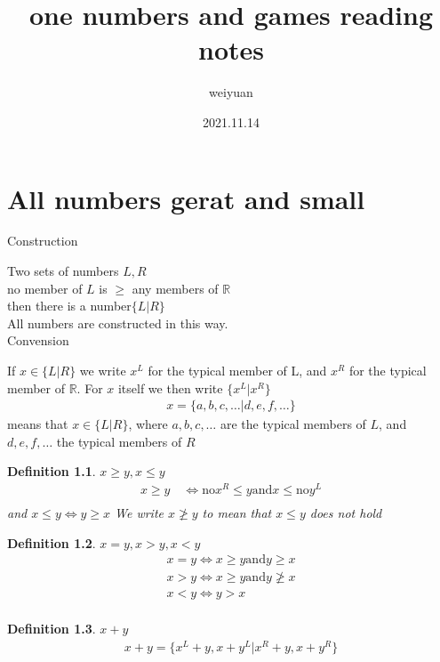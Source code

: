 \documentclass[10pt,a4paper]{book}
\title{one numbers and games reading notes}
\author{weiyuan}
\date{2021.11.14}
\newtheorem{myDef}{Definition}
\begin{document}
	\maketitle
\chapter{All numbers gerat and small}
Construction

Two sets of numbers $  L,R  $\\
no member of $ L $ is $ \ge  $ any members of $ \mathbb{R} $\\
then there is a number$ \{L|R\} $\\
All numbers are constructed in this way.\\

Convension

If $ x\in\{L|R\} $ we write $ x^L $ for the typical member of L, and $ x^R $ for the typical member of $ \mathbb{R} $. For $ x $ itself we then write $ \{x^L|x^R\} $ 
\begin{gather}
	x = \{ a,b,c,\dots | d,e,f,\dots \}
\end{gather}
means that $ x\in \{L|R\} $, where $ a,b,c,\dots $ are the typical members of $ L $, and $ d,e,f,\dots $ the typical members of $ R $\\


\begin{myDef}
	$ x \ge y, x \le y $\\
	\begin{gather*}
		x \ge y \quad \iff \text{no} x^R \le y \text{and} x \le \text{no} y^L\\
	\end{gather*}
	and $ x\le y \iff y\ge x $
	We write $ x\ngeq y $ to mean that $ x \le y $ does not hold
	
\end{myDef}

\begin{myDef}
	$ x=y, x>y, x<y $\\
	\begin{gather*}
		x = y \iff x\ge y \text{and} y \ge x\\
		x > y \iff x\ge y \text{and} y \ngeq x\\
		x < y \iff y>x\\		
	\end{gather*}
	
\end{myDef}

\begin{myDef}
	$ x+y $\\
	\begin{gather*}
		x+y = \{x^L+y , x+y^L | x^R+y, x+y^R\}
	\end{gather*}
\end{myDef}
	
\end{document}
